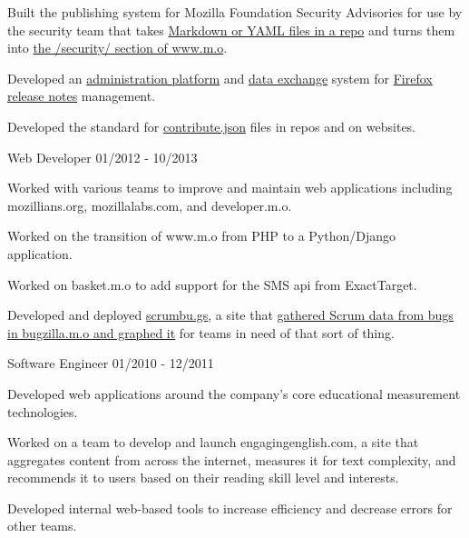 \documentclass[11pt]{article} %
\begin{document}
\begin{description}
\item Built the publishing system for Mozilla Foundation Security Advisories for use by the security team that takes
\href{https://github.com/mozilla/foundation-security-advisories}{Markdown or YAML files in a repo} and turns them into
\href{https://www.mozilla.org/en-US/security/advisories/}{the /security/ section of www.m.o}.

\item Developed an \href{https://github.com/mozilla/nucleus/}{administration platform} and
\href{https://github.com/mozilla/release-notes/}{data exchange} system for
\href{https://www.mozilla.org/en-US/firefox/releases/}{Firefox release notes} management.

\item Developed the standard for \href{https://www.contributejson.org/}{contribute.json} files in repos and on websites.

           {Web Developer}
           {01/2012 - 10/2013}

\item Worked with various teams to improve and maintain web applications including mozillians.org, mozillalabs.com, and developer.m.o.

\item Worked on the transition of www.m.o from PHP to a Python/Django application.

\item Worked on basket.m.o to add support for the SMS api from ExactTarget.

\item Developed and deployed \href{https://github.com/mozilla/scrumbugz}{scrumbu.gs}, a site that
\href{https://blog.mozilla.org/webdev/2012/03/27/scrum-and-bugzilla/}{gathered Scrum data from bugs in bugzilla.m.o and graphed it} for teams in
need of that sort of thing.

           {Software Engineer}
           {01/2010 - 12/2011}

\item Developed web applications around the company's core educational measurement technologies.

\item Worked on a team to develop and launch engagingenglish.com, a site that aggregates content from across the internet,
measures it for text complexity, and recommends it to users based on their reading skill level and interests.

\item Developed internal web-based tools to increase efficiency and decrease errors for other teams.


\end{description}
\end{document}
